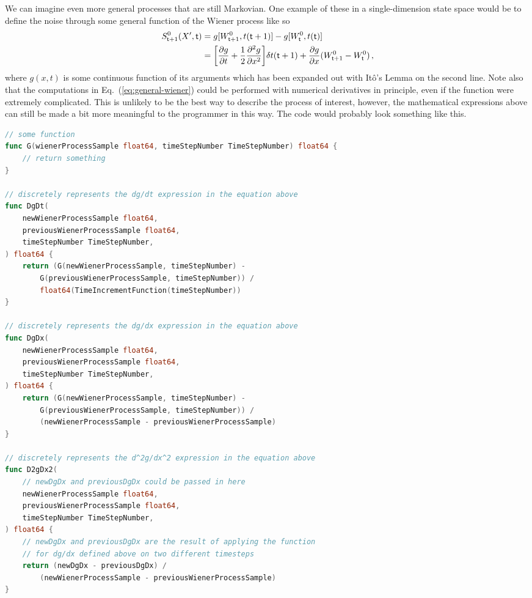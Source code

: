 \documentclass{book}
\begin{document}
We can imagine even more general processes that are still Markovian. One example of these in a single-dimension state space would be to define the noise through some general function of the Wiener process like so
\begin{align}
S^0_{{\sf t}+1}(X',{\sf t}) &= g[W^0_{{\sf t}+1},t({\sf t}+1)]-g[W^0_{\sf t}, t({\sf t})] \\
&= \bigg[ \frac{\partial g}{\partial t} + \frac{1}{2}\frac{\partial^2 g}{\partial x^2} \bigg] \delta t ({\sf t}+1) + \frac{\partial g}{\partial x} (W^0_{{\sf t}+1}-W^0_{\sf t}) \label{eq:general-wiener}\,,
\end{align}
where $g(x,t)$ is some continuous function of its arguments which has been expanded out with Itô's Lemma on the second line. Note also that the computations in Eq.~(\ref{eq:general-wiener}) could be performed with numerical derivatives in principle, even if the function were extremely complicated. This is unlikely to be the best way to describe the process of interest, however, the mathematical expressions above can still be made a bit more meaningful to the programmer in this way. The code would probably look something like this.

\begin{lstlisting}[language=Go]
// some function
func G(wienerProcessSample float64, timeStepNumber TimeStepNumber) float64 {
    // return something
}

// discretely represents the dg/dt expression in the equation above
func DgDt(
    newWienerProcessSample float64, 
    previousWienerProcessSample float64,
    timeStepNumber TimeStepNumber,
) float64 {
    return (G(newWienerProcessSample, timeStepNumber) - 
        G(previousWienerProcessSample, timeStepNumber)) / 
        float64(TimeIncrementFunction(timeStepNumber))
}

// discretely represents the dg/dx expression in the equation above
func DgDx(
    newWienerProcessSample float64, 
    previousWienerProcessSample float64,
    timeStepNumber TimeStepNumber,
) float64 {
    return (G(newWienerProcessSample, timeStepNumber) - 
        G(previousWienerProcessSample, timeStepNumber)) / 
        (newWienerProcessSample - previousWienerProcessSample)
}

// discretely represents the d^2g/dx^2 expression in the equation above
func D2gDx2(
    // newDgDx and previousDgDx could be passed in here
    newWienerProcessSample float64, 
    previousWienerProcessSample float64,
    timeStepNumber TimeStepNumber,
) float64 {
    // newDgDx and previousDgDx are the result of applying the function 
    // for dg/dx defined above on two different timesteps
    return (newDgDx - previousDgDx) / 
        (newWienerProcessSample - previousWienerProcessSample)
}
\end{lstlisting}
\end{document}
